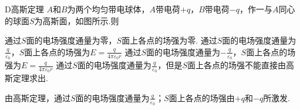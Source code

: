 {\hspace{-2.16em}
\begin{minipage}{0.67\textwidth}
\begin{choice}{D}{高斯定理}
    $A$和$B$为两个均匀带电球体，$A$带电荷$+q$，$B$带电荷$-q$，作一与$A$同心的球面$S$为高斯面，如图所示.则
    \begin{tasks}
        \task 通过$S$面的电场强度通量为零，$S$面上各点的场强为零.
        \task 通过$S$面的电场强度通量为$\frac{q}{\varepsilon_0}$，$S$面上各点的场强为$E=\frac{q}{4\pi\varepsilon_0r}$
        \task 通过$S$面的电场强度通量为$-\frac{q}{\varepsilon_0}$，$S$面上各点的场强为$E=\frac{q}{4\pi\varepsilon_0r}$
        \task 通过$S$面的电场强度通量为$\frac{q}{\varepsilon_0}$，但是$S$面上各点的场强不能直接由高斯定理求出.
    \end{tasks}
\end{choice}
\end{minipage}
\hfill
\begin{minipage}[c]{0.33\textwidth}
\begin{center}
\end{center}
\end{minipage}
\begin{solution}
    由高斯定理，通过$S$面的电场强度通量为$\frac{q}{\varepsilon_0}$；$S$面上各点的场强由$+q$和$-q$所激发.
\end{solution}
}
